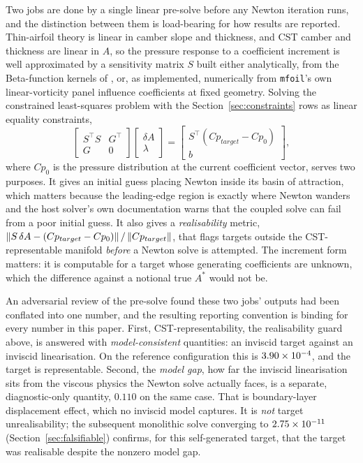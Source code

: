 Two jobs are done by a single linear pre-solve before any Newton iteration
runs, and the distinction between them is load-bearing for how results are
reported. Thin-airfoil theory is linear in camber slope and thickness, and CST
camber and thickness are linear in $A$, so the pressure response to a
coefficient increment is well approximated by a sensitivity matrix $S$ built
either analytically, from the Beta-function kernels of
\citet{joseph2021closed}, or, as implemented, numerically from
\texttt{mfoil}'s own linear-vorticity panel influence coefficients at fixed
geometry. Solving the constrained least-squares problem with the
Section~\ref{sec:constraints} rows as linear equality constraints,
\begin{equation}
  \begin{bmatrix} S^\top S & G^\top \\ G & 0 \end{bmatrix}
  \begin{bmatrix} \delta A \\ \lambda \end{bmatrix}
  = \begin{bmatrix} S^\top (Cp_{target}-Cp_0) \\ b \end{bmatrix},
  \label{eq:kkt}
\end{equation}
where $Cp_0$ is the pressure distribution at the current coefficient vector,
serves two purposes. It gives an initial guess placing Newton inside its basin
of attraction, which matters because the leading-edge region is exactly where
Newton wanders and the host solver's own documentation warns that the coupled
solve can fail from a poor initial guess. It also gives a
\emph{realisability} metric,
$\left\|S\,\delta A - (Cp_{target}-Cp_0)\right\|/\left\|Cp_{target}\right\|$, that flags
targets outside the CST-representable manifold \emph{before} a Newton solve is
attempted. The increment form matters: it is computable for a target whose
generating coefficients are unknown, which the difference against a notional
true $A^\ast$ would not be.

An adversarial review of the pre-solve found these two jobs' outputs had been
conflated into one number, and the resulting reporting convention is binding
for every number in this paper. First, CST-representability, the realisability
guard above, is answered with \emph{model-consistent} quantities: an inviscid
target against an inviscid linearisation. On the reference configuration this
is $3.90\times10^{-4}$, and the target is representable. Second, the \emph{model
gap}, how far the inviscid linearisation sits from the viscous physics the
Newton solve actually faces, is a separate, diagnostic-only quantity, $0.110$
on the same case. That is boundary-layer displacement effect, which no
inviscid model captures. It is \emph{not} target unrealisability; the
subsequent monolithic solve converging to $2.75\times10^{-11}$
(Section~\ref{sec:falsifiable}) confirms, for this self-generated target, that
the target was realisable despite the nonzero model gap.

